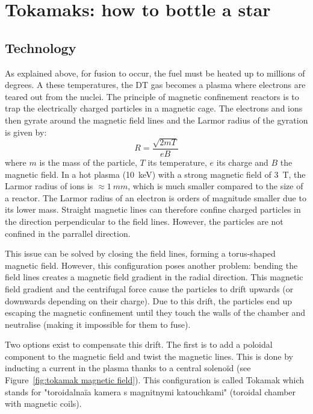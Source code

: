 
\section{Tokamaks: how to bottle a star}

\subsection{Technology \cite{mccracken_fusion_2013}}
As explained above, for fusion to occur, the fuel must be heated up to millions of degrees.
A these temperatures, the DT gas becomes a plasma where electrons are teared out from the nuclei.
The principle of magnetic confinement reactors is to trap the electrically charged particles in a magnetic cage.
The electrons and ions then gyrate around the magnetic field lines and the Larmor radius of the gyration is given by:
\begin{equation}
    R =  \frac{\sqrt{2 m T}}{e B}
\end{equation}
where $m$ is the mass of the particle, $T$ its temperature, $e$ its charge and $B$ the magnetic field.
In a hot plasma (\SI{10}{keV}) with a strong magnetic field of \SI{3}{T}, the Larmor radius of ions is $\approx \SI{1}{mm}$, which is much smaller compared to the size of a reactor.
The Larmor radius of an electron is orders of magnitude smaller due to its lower mass.
Straight magnetic lines can therefore confine charged particles in the direction perpendicular to the field lines.
However, the particles are not confined in the parrallel direction.

This issue can be solved by closing the field lines, forming a torus-shaped magnetic field.
However, this configuration poses another problem: bending the field lines creates a magnetic field gradient in the radial direction.
This magnetic field gradient and the centrifugal force cause the particles to drift upwards (or downwards depending on their charge).
Due to this drift, the particles end up escaping the magnetic confinement until they touch the walls of the chamber and neutralise (making it impossible for them to fuse).

Two options exist to compensate this drift.
The first is to add a poloidal component to the magnetic field and twist the magnetic lines.
This is done by inducting a current in the plasma thanks to a central solenoïd (see Figure~\ref{fig:tokamak magnetic field}).
This configuration is called Tokamak which stands for "toroidalnaïa kamera s magnitnymi katouchkami" (toroidal chamber with magnetic coils).

